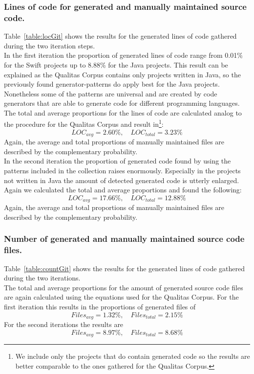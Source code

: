 \subsubsection{Lines of code for generated and manually maintained source code.}
Table~\ref{table:locGit} shows the results for the generated lines of code gathered during the two iteration steps.\\
In the first iteration the proportion of generated lines of code range from 0.01\% for the Swift projects up to 8.88\% for the Java projects. This result can be explained as the Qualitas Corpus contains only projects written in Java, so the previously found generator-patterns do apply best for the Java projects. Nonetheless some of the patterns are universal and are created by code generators that are able to generate code for different programming languages.\\
The total and average proportions for the lines of code are calculated analog to the procedure for the Qualitas Corpus and result in\footnote{
	\label{note:onlyGenerated}
	We include only the projects that do contain generated code so the results are better comparable to the ones gathered for the Qualitas Corpus.
}:
\begin{equation}
	\label{eq:locGit_1}
	LOC_{avg} = 2.60\%, \quad LOC_{total} = 3.23\%
\end{equation}
Again, the average and total proportions of manually maintained files are described by the complementary probability.\\
In the second iteration the proportion of generated code found by using the patterns included in the collection raises enormously. Especially in the projects not written in Java the amount of detected generated code is utterly enlarged.\\
Again we calculated the total and average proportions and found the following:
\begin{equation}
\label{eq:locGit_2}
LOC_{avg} = 17.66\%, \quad LOC_{total} = 12.88\%
\end{equation}
Again, the average and total proportions of manually maintained files are described by the complementary probability.

\subsubsection{Number of generated and manually maintained source code files.}
Table~\ref{table:countGit} shows the results for the generated lines of code gathered during the two iterations.\\
The total and average proportions for the amount of generated source code files are again calculated using the equations used for the Qualitas Corpus.
For the first iteration this results in the proportions of generated files of
\begin{equation}
\label{eq:countGit_1}
	Files_{avg} = 1.32\%, \quad Files_{total} = 2.15\%
\end{equation} 
For the second iterations the results are 
\begin{equation}
\label{eq:countGit_2}
Files_{avg} = 8.97\%, \quad Files_{total} = 8.68\%
\end{equation} 

